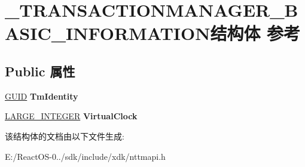 \hypertarget{struct___t_r_a_n_s_a_c_t_i_o_n_m_a_n_a_g_e_r___b_a_s_i_c___i_n_f_o_r_m_a_t_i_o_n}{}\section{\+\_\+\+T\+R\+A\+N\+S\+A\+C\+T\+I\+O\+N\+M\+A\+N\+A\+G\+E\+R\+\_\+\+B\+A\+S\+I\+C\+\_\+\+I\+N\+F\+O\+R\+M\+A\+T\+I\+O\+N结构体 参考}
\label{struct___t_r_a_n_s_a_c_t_i_o_n_m_a_n_a_g_e_r___b_a_s_i_c___i_n_f_o_r_m_a_t_i_o_n}
\subsection*{Public 属性}
\begin{DoxyCompactItemize}
\item 
\mbox{\label{struct___t_r_a_n_s_a_c_t_i_o_n_m_a_n_a_g_e_r___b_a_s_i_c___i_n_f_o_r_m_a_t_i_o_n_a9a24daa4a14569c9cc2d89c205092ff0}} 
\hyperlink{interface_g_u_i_d}{G\+U\+ID} {\bfseries Tm\+Identity}
\item 
\mbox{\label{struct___t_r_a_n_s_a_c_t_i_o_n_m_a_n_a_g_e_r___b_a_s_i_c___i_n_f_o_r_m_a_t_i_o_n_aa0a16ea6cf93cf823dca2b8fb7d7e5a0}} 
\hyperlink{union___l_a_r_g_e___i_n_t_e_g_e_r}{L\+A\+R\+G\+E\+\_\+\+I\+N\+T\+E\+G\+ER} {\bfseries Virtual\+Clock}
\end{DoxyCompactItemize}


该结构体的文档由以下文件生成\+:\begin{DoxyCompactItemize}
\item 
E\+:/\+React\+O\+S-\/0../sdk/include/xdk/nttmapi.\+h\end{DoxyCompactItemize}
